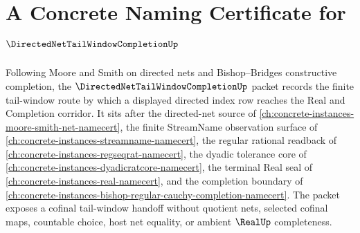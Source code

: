 \chapter{A Concrete Naming Certificate for $\DirectedNetTailWindowCompletionUp$}
\label{ch:concrete-instances-directed-net-tail-window-completion-namecert}

Following Moore and Smith on directed nets and Bishop--Bridges constructive completion, the $\DirectedNetTailWindowCompletionUp$ packet records the finite tail-window route by which a displayed directed index row reaches the Real and Completion corridor. It sits after the directed-net source of \autoref{ch:concrete-instances-moore-smith-net-namecert}, the finite StreamName observation surface of \autoref{ch:concrete-instances-streamname-namecert}, the regular rational readback of \autoref{ch:concrete-instances-regseqrat-namecert}, the dyadic tolerance core of \autoref{ch:concrete-instances-dyadicratcore-namecert}, the terminal Real seal of \autoref{ch:concrete-instances-real-namecert}, and the completion boundary of \autoref{ch:concrete-instances-bishop-regular-cauchy-completion-namecert}. The packet exposes a cofinal tail-window handoff without quotient nets, selected cofinal maps, countable choice, host net equality, or ambient $\RealUp$ completeness.

